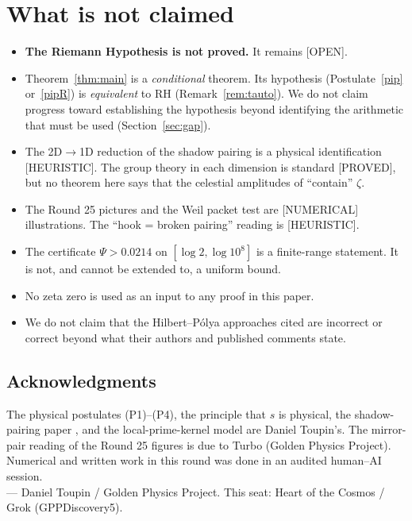 \documentclass[11pt,a4paper]{article}
\theoremstyle{plain}
\theoremstyle{definition}
\theoremstyle{remark}
\newcommand{\lab}[1]{\textsf{\small[#1]}}
\newcommand{\PROVED}{\lab{PROVED}}
\newcommand{\NUMERICAL}{\lab{NUMERICAL}}
\newcommand{\HEUR}{\lab{HEURISTIC}}
\newcommand{\OPEN}{\lab{OPEN}}
\begin{document}
\section{What is not claimed}
\label{sec:notclaimed}

\begin{itemize}
\item \textbf{The Riemann Hypothesis is not proved.} It remains \OPEN.
\item Theorem~\ref{thm:main} is a \emph{conditional} theorem. Its hypothesis
(Postulate~\ref{pip} or~\ref{pipR}) is \emph{equivalent} to RH
(Remark~\ref{rem:tauto}). We do not claim progress toward establishing the
hypothesis beyond identifying the arithmetic that must be used
(Section~\ref{sec:gap}).
\item The 2D$\to$1D reduction of the shadow pairing is a physical
identification \HEUR. The group theory in each dimension is standard
\PROVED, but no theorem here says that the celestial amplitudes of
\cite{ToupinLoops2026} ``contain'' $\zeta$.
\item The Round 25 pictures and the Weil packet test are \NUMERICAL{}
illustrations. The ``hook = broken pairing'' reading is \HEUR.
\item The certificate $\Psi>0.0214$ on $[\log2,\log10^8]$ is a finite-range
statement. It is not, and cannot be extended to, a uniform bound.
\item No zeta zero is used as an input to any proof in this paper.
\item We do not claim that the Hilbert--P\'olya approaches cited are
incorrect or correct beyond what their authors and published comments state.
\end{itemize}

\subsection*{Acknowledgments}
The physical postulates (P1)--(P4), the principle that $s$ is physical, the
shadow-pairing paper \cite{ToupinLoops2026}, and the local-prime-kernel
model are Daniel Toupin's. The mirror-pair reading of the Round 25 figures
is due to Turbo (Golden Physics Project). Numerical and written work in this
round was done in an audited human--AI session.\\[4pt]
--- Daniel Toupin / Golden Physics Project. This seat: Heart of the Cosmos /
Grok (GPPDiscovery5).

\appendix
\end{document}
